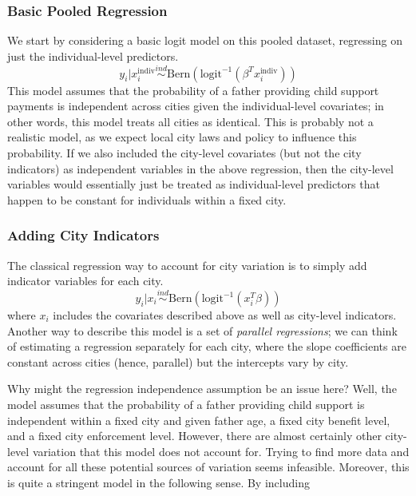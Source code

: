 \documentclass[12pt]{article}
\begin{document}
\subsubsection{Basic Pooled Regression}
We start by considering a basic logit model on this pooled dataset, regressing on just the individual-level predictors. 
\[y_i|x_i^{\text{indiv}} \overset{ind}{\sim} \text{Bern}(\text{logit}^{-1}(\beta^T x_i^{\text{indiv}})) \]
This model assumes that the probability of a father providing child support payments is independent across cities given the individual-level covariates; in other words, this model treats all cities as identical. 
This is probably not a realistic model, as we expect local city laws and policy to influence this probability. If we also included the city-level covariates (but not the city indicators) as independent variables in the above regression, then the city-level variables would essentially just be treated as individual-level predictors that happen to be constant for individuals within a fixed city. 

\subsubsection{Adding City Indicators}
The classical regression way to account for city variation is to simply add indicator variables for each city. 
\[y_i|x_i \overset{ind}{\sim} \text{Bern}(\text{logit}^{-1}(x_i^T \beta)) \]
where $x_i$ includes the covariates described above as well as city-level indicators. Another way to describe this model is a set of \textit{parallel regressions}; we can think of estimating a regression 
separately for each city, where the slope coefficients are constant across cities (hence, parallel) but the intercepts vary by city. 

Why might the regression independence assumption be an issue here? Well, the model assumes that the probability of a father providing 
child support is independent within a fixed city and given father age, a fixed city benefit level, and a fixed city enforcement level. However, there are almost certainly other city-level variation that this model 
does not account for. Trying to find more data and account for all these potential sources of variation seems infeasible. Moreover, this is quite a stringent model in the following sense. By including 
\end{document}
